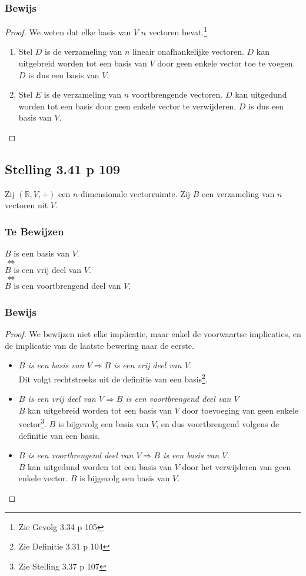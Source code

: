 \documentclass[lineaire_algebra_oplossingen.tex]{subfiles}
\begin{document}
\subsubsection*{Bewijs}
\begin{proof}
We weten dat elke basis van $V$ $n$ vectoren bevat.\footnote{Zie Gevolg 3.34 p 105}
\begin{enumerate}
\item
Stel $D$ is de verzameling van $n$ lineair onafhankelijke vectoren. $D$ kan uitgebreid worden tot een basis van $V$ door geen enkele vector toe te voegen. $D$ is dus een basis van $V$.
\item
Stel $E$ is de verzameling van $n$ voortbrengende vectoren. $D$ kan uitgedund worden tot een basis door geen enkele vector te verwijderen. $D$ is dus een basis van $V$.
\end{enumerate}
\end{proof}

\subsection{Stelling 3.41 p 109}
Zij $(\mathbb{R},V,+)$ een $n$-dimensionale vectorruimte. Zij $B$ een verzameling van $n$ vectoren uit $V$.
\subsubsection*{Te Bewijzen}
\begin{center}
$B$ is een basis van $V$.\\$\Leftrightarrow$\\
$B$ is een vrij deel van $V$.\\$\Leftrightarrow$\\
$B$ is een voortbrengend deel van $V$.
\end{center}
\subsubsection*{Bewijs}
\begin{proof}
We bewijzen niet elke implicatie, maar enkel de voorwaartse implicaties, en de implicatie van de laatste bewering naar de eerste.
\begin{itemize}
\item \emph{$B$ is een basis van $V \Rightarrow B$ is een vrij deel van $V$.}\\
Dit volgt rechtstreeks uit de definitie van een basis\footnote{Zie Definitie 3.31 p 104}.
\item \emph{$B$ is een vrij deel van $V \Rightarrow B$ is een voortbrengend deel van $V$}\\
$B$ kan uitgebreid worden tot een basis van $V$ door toevoeging van geen enkele vector\footnote{Zie Stelling 3.37 p 107}. $B$ is bijgevolg een basis van $V$, en dus voortbrengend volgens de definitie van een basis.
\item \emph{$B$ is een voortbrengend deel van $V \Rightarrow B$ is een basis van $V$.}\\
$B$ kan uitgedund worden tot een basis van $V$ door het verwijderen van geen enkele vector. $B$ is bijgevolg een basis van $V$.
\end{itemize}
\end{proof}
\end{document}
